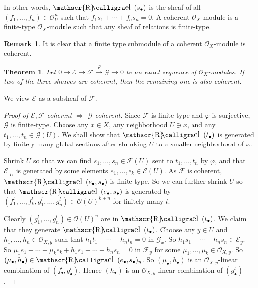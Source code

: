 \documentclass[12pt,b5paper,notitlepage]{report}
\theoremstyle{definition}
\newtheorem{rem}[df]{Remark}
\theoremstyle{plain}
\newtheorem{thm}[df]{Theorem}
\DeclareMathOperator{\Rel}{\mathscr{R}\text{\kern -3pt {\calligra\large el}~}\,}
\newcommand{\scr}{\mathscr}
\newcommand{\blt}{\bullet}
\numberwithin{equation}{section}
\begin{document}
In other words, $\Rel(s_\blt)$ is the sheaf of all $(f_1,\dots,f_n)\in\scr O_U^n$ such that $f_1s_1+\cdots+f_ns_n=0$. A coherent $\scr O_X$-module is a finite-type $\scr O_X$-module such that any sheaf of relations is finite-type.



\begin{rem}
It is clear that a finite type submodule of a coherent $\scr O_X$-module is coherent.
\end{rem}





\begin{thm}\label{lb20}
Let $0\rightarrow\scr E\rightarrow\scr F\xrightarrow{\varphi}\scr G\rightarrow0$ be an exact sequence of $\scr O_X$-modules. If two of the three sheaves are coherent, then the remaining one is also coherent.
\end{thm}

We view $\scr E$ as a subsheaf of $\scr F$.

\begin{proof}[Proof of $\scr E,\scr F$ coherent $\Rightarrow$ $\scr G$ coherent]
Since $\scr F$ is finite-type and $\varphi$ is surjective, $\scr G$ is finite-type. Choose any $x\in X$, any neighborhood $U\ni x$, and any $t_1,\dots,t_n\in\scr G(U)$. We shall show that $\Rel(t_\blt)$ is generated by finitely many global sections after shrinking $U$ to a smaller neighborhood of $x$. 

Shrink $U$ so that we can find $s_1,\dots,s_n\in \scr F(U)$ sent to $t_1,\dots,t_n$ by $\varphi$, and that $\scr E|_U$ is generated by some elements $e_1,\dots,e_k\in\scr E(U)$. As $\scr F$ is coherent, $\Rel(e_\blt,s_\blt)$ is finite-type. So we can further shrink $U$ so that $\Rel(e_\blt,s_\blt)$ is generated by $(f_1^l,\dots,f_k^l,g_1^l,\dots,g_n^l)\in\scr O(U)^{k+n}$ for finitely many $l$.

Clearly $(g_1^l,\dots,g_n^l)\in\scr O(U)^n$ are in $\Rel(t_\blt)$. We claim that they generate $\Rel(t_\blt)$. Choose any $y\in U$ and $h_1,\dots,h_n\in\scr O_{X,y}$ such that $h_1t_1+\cdots+h_nt_n=0$ in $\scr G_x$. So $h_1s_1+\cdots+h_ns_n\in\scr E_y$. So $\mu_1e_1+\cdots+\mu_ke_k+h_1s_1+\cdots+h_ns_n=0$ in $\scr F_y$ for some $\mu_1,\dots,\mu_k\in\scr O_{X,y}$. So $(\mu_\blt,h_\blt)\in\Rel(e_\blt,s_\blt)_y$. So $(\mu_\blt,h_\blt)$ is an $\scr O_{X,y}$-linear combination of $(f_\blt^l,g_\blt^l)$. Hence $(h_\blt)$ is an $\scr O_{X,y}$-linear combination of $(g_\blt^l)$.
\end{proof}
\end{document}
